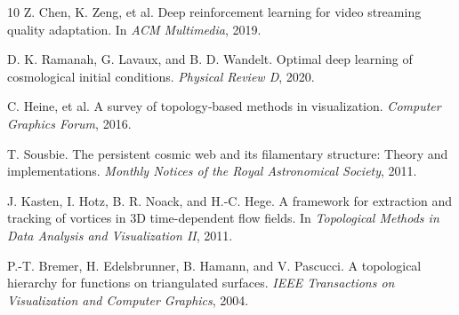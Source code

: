 \documentclass[11pt]{article}
\begin{document}
\begin{thebibliography}{10}
Z. Chen, K. Zeng, et al.
\newblock Deep reinforcement learning for video streaming quality adaptation.
\newblock In \textit{ACM Multimedia}, 2019.

D. K. Ramanah, G. Lavaux, and B. D. Wandelt.
\newblock Optimal deep learning of cosmological initial conditions.
\newblock \textit{Physical Review D}, 2020.

C. Heine, et al.
\newblock A survey of topology‐based methods in visualization.
\newblock \textit{Computer Graphics Forum}, 2016.

T. Sousbie.
\newblock The persistent cosmic web and its filamentary structure: Theory and implementations.
\newblock \textit{Monthly Notices of the Royal Astronomical Society}, 2011.

J. Kasten, I. Hotz, B. R. Noack, and H.-C. Hege.
\newblock A framework for extraction and tracking of vortices in 3D time-dependent flow fields.
\newblock In \textit{Topological Methods in Data Analysis and Visualization II}, 2011.

P.-T. Bremer, H. Edelsbrunner, B. Hamann, and V. Pascucci.
\newblock A topological hierarchy for functions on triangulated surfaces.
\newblock \textit{IEEE Transactions on Visualization and Computer Graphics}, 2004.

\end{thebibliography}
\end{document}

